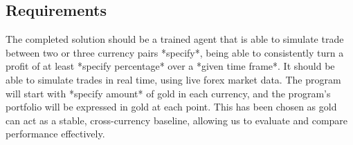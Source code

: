     \subsection{Requirements} The completed solution should be a trained agent that is able to simulate trade between two or three currency pairs *specify*, being able to consistently turn a profit of at least *specify percentage* over a *given time frame*. It should be able to simulate trades in real time, using live forex market data. The program will start with *specify amount* of gold in each currency, and the program's portfolio will be expressed in gold at each point. This has been chosen as gold can act as a stable, cross-currency baseline, allowing us to evaluate and compare performance effectively.

